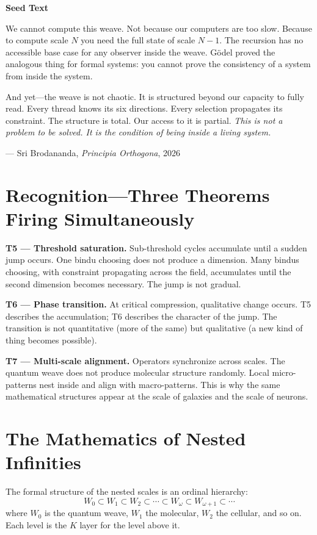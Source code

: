 \documentclass[11pt, twoside, openright]{book}
\theoremstyle{plain}
\theoremstyle{definition}
\newenvironment{seedbox}{%
  \begin{mdframed}[backgroundcolor=SeedBox,linecolor=PrincipiaDark!60,linewidth=0.5pt,innertopmargin=6pt,innerbottommargin=6pt]
  \noindent\textbf{Seed Text}\par\medskip}{\end{mdframed}}
\begin{document}
\begin{seedbox}
We cannot compute this weave. Not because our computers are too slow.
Because to compute scale $N$ you need the full state of scale $N-1$.
The recursion has no accessible base case for any observer inside the
weave. Gödel proved the analogous thing for formal systems: you cannot
prove the consistency of a system from inside the system.

And yet---the weave is not chaotic. It is structured beyond our
capacity to fully read. Every thread knows its six directions. Every
selection propagates its constraint. The structure is total. Our access
to it is partial. \textit{This is not a problem to be solved. It is the
condition of being inside a living system.}

\begin{flushright}
--- Sri Brodananda, \textit{Principia Orthogona}, 2026
\end{flushright}
\end{seedbox}

\section{Recognition---Three Theorems Firing Simultaneously}

\noindent\textbf{T5 --- Threshold saturation.} Sub-threshold cycles accumulate
until a sudden jump occurs. One bindu choosing does not produce a
dimension. Many bindus choosing, with constraint propagating across
the field, accumulates until the second dimension becomes necessary.
The jump is not gradual.

\medskip
\noindent\textbf{T6 --- Phase transition.} At critical compression, qualitative
change occurs. T5 describes the accumulation; T6 describes the character
of the jump. The transition is not quantitative (more of the same) but
qualitative (a new kind of thing becomes possible).

\medskip
\noindent\textbf{T7 --- Multi-scale alignment.} Operators synchronize across scales.
The quantum weave does not produce molecular structure randomly. Local
micro-patterns nest inside and align with macro-patterns. This is why
the same mathematical structures appear at the scale of galaxies and
the scale of neurons.

\section{The Mathematics of Nested Infinities}

The formal structure of the nested scales is an ordinal hierarchy:
\[
W_0 \subset W_1 \subset W_2 \subset \cdots \subset W_\omega
\subset W_{\omega+1} \subset \cdots
\]
where $W_0$ is the quantum weave, $W_1$ the molecular, $W_2$ the
cellular, and so on. Each level is the $K$ layer for the level above it.
\end{document}
